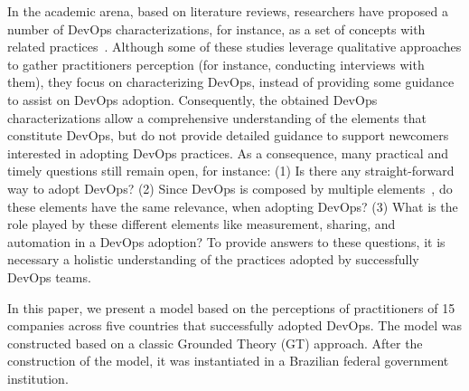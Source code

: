 In the academic arena, based on literature reviews, researchers have proposed a
number of DevOps characterizations, for instance, as a set of concepts with
related
practices~\cite{cooperation_dev_ops_esem_2014,devops_a_definition_xp_15,dimensions_of_devops_xp_15,extending_dimensions_icsea_16,characterizing_devops_sbes_2016,qualitative_devops_journalsw_17}. Although some
of these studies leverage qualitative approaches to gather practitioners perception (for instance,
conducting interviews with them), they focus on characterizing DevOps,
instead of providing some guidance to assist on DevOps adoption. Consequently,
the obtained DevOps characterizations allow a comprehensive understanding of
the elements that constitute DevOps, but do not provide detailed guidance to
support newcomers interested in adopting DevOps practices.
As a consequence, many practical and timely questions still remain open, for
instance: (1) Is there any straight-forward way to adopt DevOps? (2) Since
DevOps is composed by multiple elements~\cite{dimensions_of_devops_xp_15}, do
these elements have the same relevance, when adopting DevOps?
(3) What is the role played by these different elements like measurement, sharing, and automation
in a DevOps adoption? To provide answers to these questions, it is necessary a holistic
understanding of the practices adopted by successfully DevOps teams.

In this paper, we present a model based on the perceptions of practitioners of
15 companies across five countries that successfully adopted DevOps. The model
was constructed based on a classic Grounded Theory (GT) approach. After the
construction of the model, it was instantiated in a Brazilian federal
government institution. 




